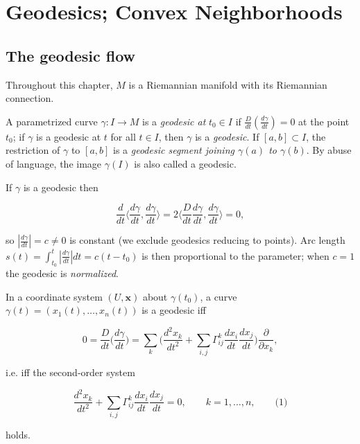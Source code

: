 \chapter{Geodesics; Convex Neighborhoods}
\label{chap:dc-geodesics-convex-neighborhoods}

\section{The geodesic flow}

Throughout this chapter, $M$ is a Riemannian manifold with its Riemannian
connection.

\begin{definition}[geodesic]
  \label{def:dc-ch3-2-1}
  \leanok
  A parametrized curve $\gamma:I\to M$ is a \emph{geodesic at} $t_0\in I$ if
  $\frac{D}{dt}\left(\frac{d\gamma}{dt}\right)=0$ at the point $t_0$; if $\gamma$ is
  a geodesic at $t$ for all $t\in I$, then $\gamma$ is a \emph{geodesic}. If
  $[a,b]\subset I$, the restriction of $\gamma$ to $[a,b]$ is a \emph{geodesic segment joining $\gamma(a)$ to $\gamma(b)$}. By abuse of language, the image $\gamma(I)$
  is also called a geodesic.
  
  If $\gamma$ is a geodesic then
  
  $$
  \frac{d}{dt}\Big\langle\frac{d\gamma}{dt},\frac{d\gamma}{dt}\Big\rangle=2\Big\langle\frac{D}{dt}\frac{d\gamma}{dt},\frac{d\gamma}{dt}\Big\rangle=0,
  $$
  
  so $\left|\frac{d\gamma}{dt}\right|=c\neq 0$ is constant (we exclude geodesics
  reducing to points). Arc length $s(t)=\int_{t_0}^t\left|\frac{d\gamma}{dt}\right|dt=c(t-t_0)$
  is then proportional to the parameter; when $c=1$ the geodesic is \emph{normalized}.
  
  In a coordinate system $(U,\mathbf{x})$ about $\gamma(t_0)$, a curve
  $\gamma(t)=(x_1(t),\dots,x_n(t))$ is a geodesic iff
  
  $$
  0=\frac{D}{dt}\Big(\frac{d\gamma}{dt}\Big)=\sum_k\Big(\frac{d^2x_k}{dt^2}+\sum_{i,j}\Gamma_{ij}^k\frac{dx_i}{dt}\frac{dx_j}{dt}\Big)\frac{\partial}{\partial x_k},
  $$
  
  i.e. iff the second-order system
  
  $$
  \frac{d^2x_k}{dt^2}+\sum_{i,j}\Gamma_{ij}^k\frac{dx_i}{dt}\frac{dx_j}{dt}=0,\qquad k=1,\dots,n,\qquad\text{(1)}
  $$
  
  holds.

\end{definition}

